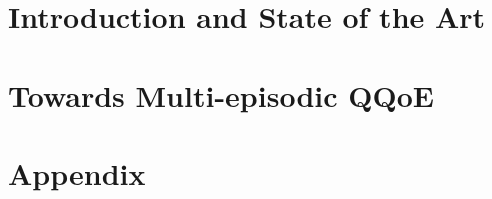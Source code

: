 \documentclass[
		twoside,openright,titlepage,numbers=noenddot,headinclude,%
                footinclude=true,cleardoublepage=empty,
                BCOR=5mm,paper=a4,fontsize=11pt, %
                ngerman,american, %
                ]{scrreprt}
\begin{document}
\cleardoublepage
\part{Introduction and State of the Art}\cleardoublepage





\part{Towards Multi-episodic QQoE}\cleardoublepage






\part{Appendix}\cleardoublepage
{} %
\setcounter{page}{1}





\end{document}
